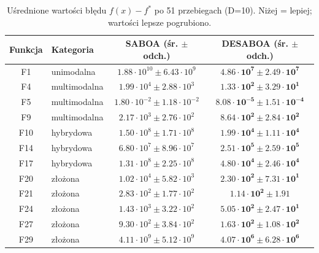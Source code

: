 \begin{table}[H]
\centering
\caption{Uśrednione wartości błędu $f(x)-f^*$ po 51 przebiegach (D=10). Niżej = lepiej; wartości lepsze pogrubiono.}
\label{tab:wyniki}
\begin{tabular}{|c|l|c|c|}
\hline
\textbf{Funkcja} & \textbf{Kategoria} & \textbf{SABOA (śr. $\pm$ odch.)} & \textbf{DESABOA (śr. $\pm$ odch.)} \\
\hline
F1 & unimodalna & $1.88\cdot10^{10} \pm 6.43\cdot10^{9}$ & $\mathbf{4.86\cdot10^{7} \pm 2.49\cdot10^{7}}$ \\
\hline
F4 & multimodalna & $1.99\cdot10^{4} \pm 2.88\cdot10^{3}$ & $\mathbf{1.33\cdot10^{2} \pm 3.29\cdot10^{1}}$ \\
\hline
F5 & multimodalna & $1.80\cdot10^{-2} \pm 1.18\cdot10^{-2}$ & $\mathbf{8.08\cdot10^{-5} \pm 1.51\cdot10^{-4}}$ \\
\hline
F9 & multimodalna & $2.17\cdot10^{3} \pm 2.76\cdot10^{2}$ & $\mathbf{8.64\cdot10^{2} \pm 2.84\cdot10^{2}}$ \\
\hline
F10 & hybrydowa & $1.50\cdot10^{8} \pm 1.71\cdot10^{8}$ & $\mathbf{1.99\cdot10^{4} \pm 1.11\cdot10^{4}}$ \\
\hline
F14 & hybrydowa & $6.80\cdot10^{7} \pm 8.96\cdot10^{7}$ & $\mathbf{2.51\cdot10^{5} \pm 2.59\cdot10^{5}}$ \\
\hline
F17 & hybrydowa & $1.31\cdot10^{8} \pm 2.25\cdot10^{8}$ & $\mathbf{4.80\cdot10^{4} \pm 2.46\cdot10^{4}}$ \\
\hline
F20 & złożona & $1.02\cdot10^{4} \pm 5.82\cdot10^{3}$ & $\mathbf{2.30\cdot10^{2} \pm 7.31\cdot10^{1}}$ \\
\hline
F21 & złożona & $2.83\cdot10^{2} \pm 1.77\cdot10^{2}$ & $\mathbf{1.14\cdot10^{2} \pm 1.91}$ \\
\hline
F24 & złożona & $1.43\cdot10^{3} \pm 3.22\cdot10^{2}$ & $\mathbf{5.05\cdot10^{2} \pm 2.47\cdot10^{1}}$ \\
\hline
F27 & złożona & $9.30\cdot10^{2} \pm 3.84\cdot10^{2}$ & $\mathbf{1.63\cdot10^{2} \pm 1.08\cdot10^{2}}$ \\
\hline
F29 & złożona & $4.11\cdot10^{9} \pm 5.12\cdot10^{9}$ & $\mathbf{4.07\cdot10^{6} \pm 6.28\cdot10^{6}}$ \\
\hline
\end{tabular}
\end{table}
